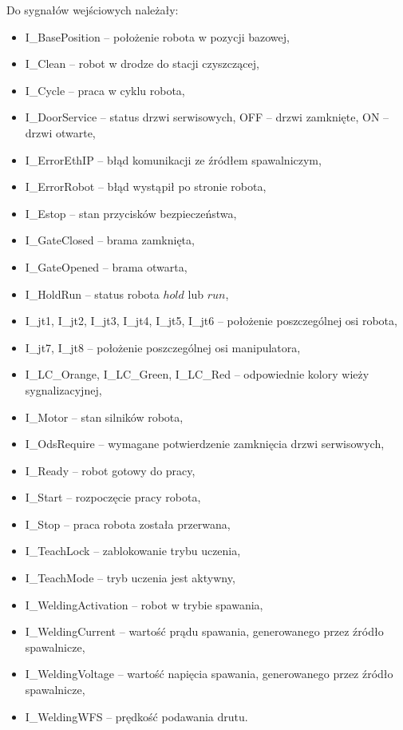 Do sygnałów wejściowych należały:
\begin{itemize}
\item	I\_BasePosition – położenie robota w pozycji bazowej,
\item	I\_Clean – robot w drodze do stacji czyszczącej,
\item	I\_Cycle – praca w cyklu robota,
\item	I\_DoorService – status drzwi serwisowych, OFF – drzwi zamknięte, ON – drzwi otwarte,
\item	I\_ErrorEthIP – błąd komunikacji ze źródłem spawalniczym,
\item	I\_ErrorRobot – błąd wystąpił po stronie robota,
\item	I\_Estop – stan przycisków bezpieczeństwa,
\item	I\_GateClosed – brama zamknięta,
\item	I\_GateOpened – brama otwarta,
\item	I\_HoldRun – status robota $hold$ lub $run$,
\item	I\_jt1, I\_jt2, I\_jt3, I\_jt4, I\_jt5, I\_jt6 – położenie poszczególnej osi robota,
\item	I\_jt7, I\_jt8 – położenie poszczególnej osi manipulatora,
\item	I\_LC\_Orange, I\_LC\_Green, I\_LC\_Red – odpowiednie kolory wieży sygnalizacyjnej,
\item	I\_Motor – stan silników robota,
\item	I\_OdsRequire – wymagane potwierdzenie zamknięcia drzwi serwisowych,
\item	I\_Ready – robot gotowy do pracy,
\item	I\_Start – rozpoczęcie pracy robota,
\item	I\_Stop – praca robota została przerwana,
\item	I\_TeachLock – zablokowanie trybu uczenia,
\item	I\_TeachMode – tryb uczenia jest aktywny,
\item	I\_WeldingActivation – robot w trybie spawania,
\item	I\_WeldingCurrent – wartość prądu spawania, generowanego przez źródło spawalnicze,
\item	I\_WeldingVoltage – wartość napięcia spawania, generowanego przez źródło spawalnicze,
\item	I\_WeldingWFS – prędkość podawania drutu.
\end{itemize}

